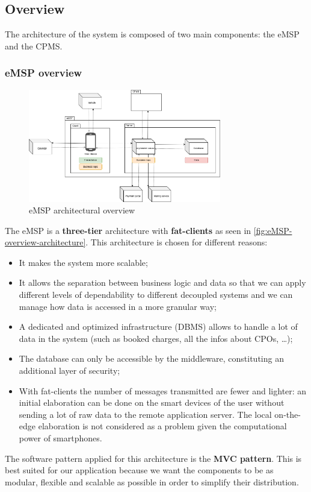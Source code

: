 
\subsection{Overview}
The architecture of the system is composed of two main components: the \ac{eMSP} and the \ac{CPMS}.

\subsubsection{\ac{eMSP} overview}

\begin{figure}[!h]
    \begin{center}
        \includegraphics[keepaspectratio, width=0.75\textwidth]{Graphics/DD-eMSP-overview.drawio.png}
        \caption{\ac{eMSP} architectural overview}
        \label{fig:eMSP-overview-architecture}
    \end{center}
\end{figure}

The \ac{eMSP} is a \textbf{three-tier} architecture with \textbf{fat-clients} as seen in \autoref{fig:eMSP-overview-architecture}. This architecture is chosen for different reasons:
\begin{itemize}
    \item It makes the system more scalable;
    \item It allows the separation between business logic and data so that we can apply different levels of dependability to different decoupled systems and we can manage how data is accessed in a more granular way;
    \item A dedicated and optimized infrastructure (\ac{DBMS}) allows to handle a lot of data in the system (such as booked charges, all the infos about \acp{CPO}, \ldots);
    \item The database can only be accessible by the middleware, constituting an additional layer of security;
    \item With fat-clients the number of messages transmitted are fewer and lighter: an initial elaboration can be done on the smart devices of the user without sending a lot of raw data to the remote application server. The local on-the-edge elaboration is not considered as a problem given the computational power of smartphones.
\end{itemize}
The software pattern applied for this architecture is the \textbf{\ac{MVC} pattern}. This is best suited for our application because we want the components to be as modular, flexible and scalable as possible in order to simplify their distribution.

